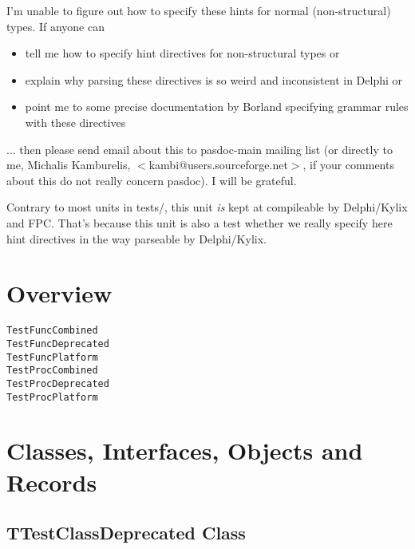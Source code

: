 \documentclass{report}
\newif\ifpdf
\begin{document}
I'm unable to figure out how to specify these hints for normal (non{-}structural) types. If anyone can \begin{itemize}
\item tell me how to specify hint directives for non{-}structural types or
\item explain why parsing these directives is so weird and inconsistent in Delphi or
\item point me to some precise documentation by Borland specifying grammar rules with these directives
\end{itemize} ... then please send email about this to pasdoc{-}main mailing list (or directly to me, Michalis Kamburelis, {$<$}kambi@users.sourceforge.net{$>$}, if your comments about this do not really concern pasdoc). I will be grateful.

Contrary to most units in tests/, this unit \textit{is} kept at compileable by Delphi/Kylix and FPC. That's because this unit is also a test whether we really specify here hint directives in the way parseable by Delphi/Kylix.
\section{Overview}
\begin{description}
\item[\texttt{\begin{ttfamily}TTestClassDeprecated\end{ttfamily} Class}]
\item[\texttt{\begin{ttfamily}TTestRecordDeprecated\end{ttfamily} Record}]
\end{description}
\begin{description}
\item[\texttt{TestFuncCombined}]
\item[\texttt{TestFuncDeprecated}]
\item[\texttt{TestFuncPlatform}]
\item[\texttt{TestProcCombined}]
\item[\texttt{TestProcDeprecated}]
\item[\texttt{TestProcPlatform}]
\end{description}
\section{Classes, Interfaces, Objects and Records}
\ifpdf
\subsection*{\large{\textbf{TTestClassDeprecated Class}}\normalsize\hspace{1ex}\hrulefill}
\else
\end{document}
